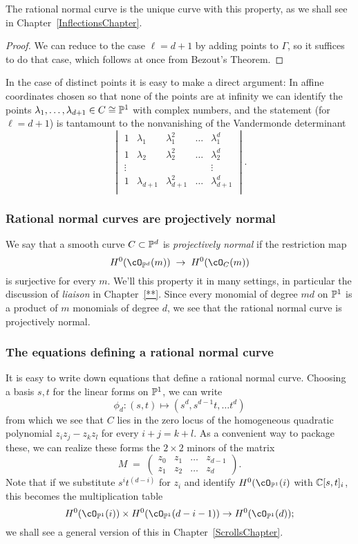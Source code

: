 The rational normal curve is the unique curve with this property, as we shall see in Chapter~\ref{InflectionsChapter}. 

\begin{proof}
We can reduce to the case $\ell = d+1$ by adding points to $\Gamma$, so it suffices to do that case, which follows at once from Bezout's Theorem.
\end{proof}

In the case of distinct points it is easy to make a direct argument: In affine coordinates chosen so that none of the points are
at infinity we can identify the points $\lambda_1,\dots,\lambda_{d+1} \in C \cong \PP^1$ with complex numbers, and the statement (for $\ell = d+1$) is tantamount to the nonvanishing of the Vandermonde determinant
$$
\begin{vmatrix}
1 & \lambda_1 & \lambda_1^2 & \dots & \lambda_1^d \\
1 & \lambda_2 & \lambda_2^2 & \dots & \lambda_2^d \\
\vdots & & & & \vdots \\
1 & \lambda_{d+1} & \lambda_{d+1}^2 & \dots & \lambda_{d+1}^d \\
\end{vmatrix}.
$$

\subsubsection{Rational normal curves are projectively normal}


We say that a smooth curve $C \subset \PP^d$ is \emph{projectively normal} if the restriction map
$$
H^0(\cO_{\PP^d}(m)) \; \to \; H^0(\cO_{C}(m)) 
$$
is surjective for every $m$. We'll this property it in many settings, in particular the discussion of \emph{liaison} in Chapter~\ref{**}.
Since every monomial of degree $md$ on $\PP^1$ is a product of $m$ monomials of degree $d$, we see that the rational normal curve is projectively normal. 


\subsubsection{The equations defining a rational normal curve}
It is easy to write down equations that define a rational normal curve. Choosing a basis $s,t$ for the linear forms on $\PP^1$, we can write
$$
\phi_d : (s,t) \mapsto (s^d, s^{d-1}t,\dots t^d)
$$
from which we see that $C$ lies in the zero locus of the homogeneous quadratic polynomial $z_iz_j - z_kz_l$ for every $i+j=k+l$. As a convenient way to package these, we can realize these forms the $2\times 2$ minors of the matrix
$$
M \; = \; \begin{pmatrix}
z_0 & z_1 & \dots & z_{d-1} \\
z_1 & z_2 & \dots & z_d
\end{pmatrix}.
$$
Note that if we substitute $s^it^{(d-i)}$ for $z_i$ and identify $H^0(\cO_{\PP^1}(i)$ with $\CC[s,t]_i$, this becomes the multiplication table
$$
H^0(\cO_{\PP^1}(i)) \times H^0(\cO_{\PP^1}(d-i-1)) \to H^0(\cO_{\PP^1}(d));
$$
we shall see a general version of this in Chapter~\ref{ScrollsChapter}. 

